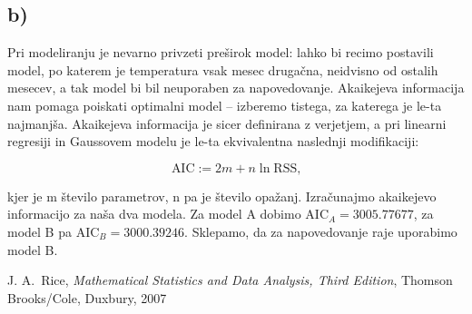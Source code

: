 \documentclass[12pt, a4paper]{article}
\begin{document}
\subsection*{b)}
Pri modeliranju je nevarno privzeti preširok model: lahko bi recimo postavili
model, po katerem je temperatura vsak mesec drugačna, neidvisno od ostalih
mesecev, a tak model bi bil neuporaben za napovedovanje. Akaikejeva 
informacija nam pomaga poiskati optimalni model – izberemo tistega, za katerega
je le-ta najmanjša. Akaikejeva informacija je sicer definirana z verjetjem, 
a pri linearni regresiji in Gaussovem modelu je le-ta ekvivalentna naslednji 
modifikaciji:  

\[
    \text{AIC} := 2m + n \ln \text{RSS,}
    \]

kjer je m število parametrov, n pa je število opažanj. Izračunajmo akaikejevo 
informacijo za naša dva modela. Za model A dobimo AIC$_A = 3005.77677$, za 
model B pa AIC$_B = 3000.39246$. Sklepamo, da za napovedovanje raje uporabimo 
model B.






\begin{thebibliography}{99}
     J. A.~Rice, \emph{Mathematical Statistics and Data Analysis, Third Edition}, Thomson Brooks/Cole, Duxbury, 2007
\end{thebibliography}
\end{document}
